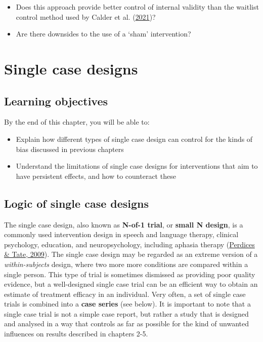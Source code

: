 \documentclass{krantz}
\providecommand{\tightlist}{%
\setlength{\itemsep}{0pt}\setlength{\parskip}{0pt}}
\begin{document}
\begin{itemize}
\tightlist
\item
  Does this approach provide better control of internal validity than the waitlist control method used by Calder et al. (\protect\hyperlink{ref-calder2021}{2021})?
\item
  Are there downsides to the use of a `sham' intervention?
\end{itemize}

\hypertarget{Single}{%
\chapter{Single case designs}\label{Single}}

\hypertarget{learning-objectives-17}{%
\section{Learning objectives}\label{learning-objectives-17}}

By the end of this chapter, you will be able to:

\begin{itemize}
\item
  Explain how different types of single case design can control for the kinds of bias discussed in previous chapters
\item
  Understand the limitations of single case designs for interventions that aim to have persistent effects, and how to counteract these
\end{itemize}

\hypertarget{logic-of-single-case-designs}{%
\section{Logic of single case designs}\label{logic-of-single-case-designs}}

The single case design, also known as \textbf{N-of-1 trial}, or \textbf{small N design}, is a commonly used intervention design in speech and language therapy, clinical psychology, education, and neuropsychology, including aphasia therapy (\protect\hyperlink{ref-perdices2009}{Perdices \& Tate, 2009}). The single case design may be regarded as an extreme version of a \emph{within-subjects} design, where two more more conditions are compared within a single person. This type of trial is sometimes dismissed as providing poor quality evidence, but a well-designed single case trial can be an efficient way to obtain an estimate of treatment efficacy in an individual. Very often, a set of single case trials is combined into a \textbf{case series} (see below). It is important to note that a single case trial is not a simple case report, but rather a study that is designed and analysed in a way that controls as far as possible for the kind of unwanted influences on results described in chapters 2-5.
\end{document}
